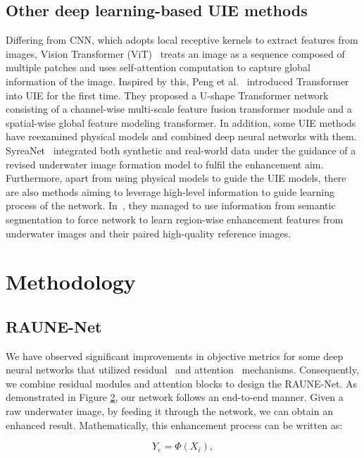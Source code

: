 \documentclass[runningheads]{llncs}
\begin{document}
\subsection{Other deep learning-based UIE methods}

Differing from CNN, which adopts local receptive kernels to extract features from images, Vision Transformer (ViT)~\cite{dosovitskiy2020image} treats an image as a sequence composed of multiple patches and uses self-attention computation to capture global information of the image. Inspired by this, Peng et al.~\cite{peng2023ushape} introduced Transformer into UIE for the first time. They proposed a U-shape Transformer network consisting of a channel-wise multi-scale feature fusion transformer module and a spatial-wise global feature modeling transformer. In addition, some UIE methods have reexamined physical models and combined deep neural networks with them. SyreaNet~\cite{wen2023syreanet} integrated both synthetic and real-world data under the guidance of a revised underwater image formation model to fulfil the enhancement aim. Furthermore, apart from using physical models to guide the UIE models, there are also methods aiming to leverage high-level information to guide learning process of the network. In~\cite{qi2022sguie}, they managed to use information from semantic segmentation to force network to learn region-wise enhancement features from underwater images and their paired high-quality reference images.

\section{Methodology}\label{sec.3}
\subsection{RAUNE-Net}
We have observed significant improvements in objective metrics for some deep neural networks that utilized residual~\cite{he2016deep} and attention~\cite{woo2018cbam} mechanisms. Consequently, we combine residual modules and attention blocks to design the RAUNE-Net. As demonstrated in Figure \hyperref[raune-net]{2}, our network follows an end-to-end manner. Given a raw underwater image, by feeding it through the network, we can obtain an enhanced result. Mathematically, this enhancement process can be written as:

\begin{equation}
    Y_e = \Phi(X_i),
\end{equation}
\end{document}
